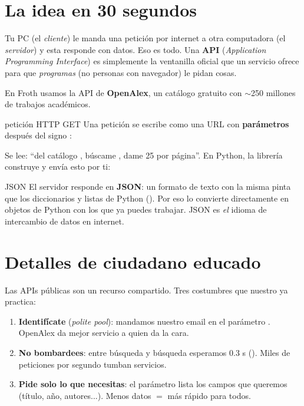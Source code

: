 \documentclass[11pt,a4paper]{article}
\begin{document}

\section{La idea en 30 segundos}

Tu PC (el \emph{cliente}) le manda una petición por internet a otra computadora
(el \emph{servidor}) y esta responde con datos. Eso es todo. Una \textbf{API}
(\emph{Application Programming Interface}) es simplemente la ventanilla oficial que un
servicio ofrece para que \emph{programas} (no personas con navegador) le pidan cosas.

En Froth usamos la API de \textbf{OpenAlex}, un catálogo gratuito con $\sim$250 millones
de trabajos académicos.

\begin{concepto}{petición HTTP GET}
Una petición se escribe como una URL con \textbf{parámetros} después del signo :
\begin{center}
\small{}
\end{center}
Se lee: ``del catálogo , búscame , dame 25 por
página''. En Python, la librería  construye y envía esto por ti:
\begin{center}
\end{center}
\end{concepto}

\begin{concepto}{JSON}
El servidor responde en \textbf{JSON}: un formato de texto con la misma pinta que los
diccionarios y listas de Python ().
Por eso  lo convierte directamente en objetos de Python con los que ya
puedes trabajar. JSON es \emph{el} idioma de intercambio de datos en internet.
\end{concepto}

\section{Detalles de ciudadano educado}

Las APIs públicas son un recurso compartido. Tres costumbres que nuestro 
ya practica:

\begin{enumerate}
  \item \textbf{Identifícate} (\emph{polite pool}): mandamos nuestro email en el parámetro
        . OpenAlex da mejor servicio a quien da la cara.
  \item \textbf{No bombardees}: entre búsqueda y búsqueda esperamos 0.3 s
        (). Miles de peticiones por segundo tumban servicios.
  \item \textbf{Pide solo lo que necesitas}: el parámetro  lista los campos
        que queremos (título, año, autores...). Menos datos $=$ más rápido para todos.
\end{enumerate}
\end{document}
